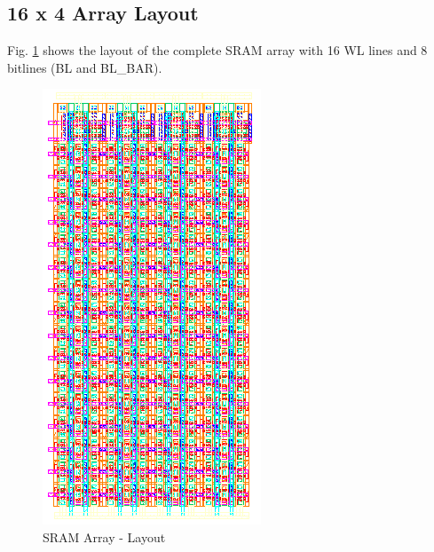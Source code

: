 \documentclass[conference]{IEEEtran}
\begin{document}
\subsection{16 x 4 Array Layout}
Fig. \ref{fig:sram_cell_array} shows the layout of the complete SRAM array with 16 WL lines and 8 bitlines (BL and BL\_BAR).
\begin{figure}[h!]
\centering
\includegraphics[clip,width=\columnwidth]{sram_array_layout.png}
\caption{SRAM Array - Layout}
\label{fig:sram_cell_array}
\end{figure}
\end{document}
